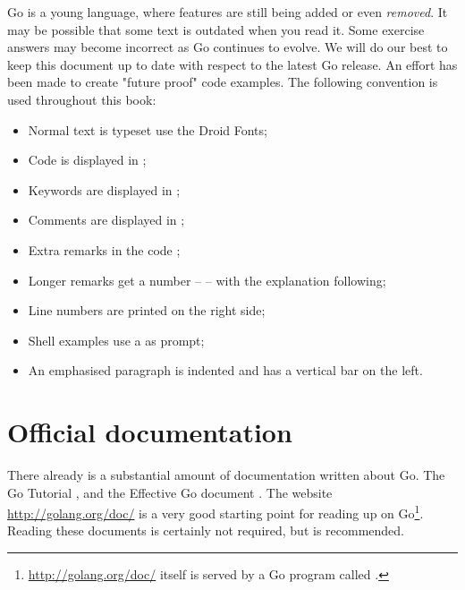 Go is a young language, where 
features are still being added or even \emph{removed}. It 
may be possible that some text is outdated when you
read it. 
Some exercise answers may become incorrect as Go continues
to evolve.
We will do our best to keep this document up to 
date with respect to the latest Go release.
An effort has been made to create "future proof" code examples.
\noindent{}The following convention is used throughout this book:
\begin{itemize}
\item Normal text is typeset use the Droid Fonts;
\item Code is displayed in ;
\item Keywords are displayed in ;
\item Comments are displayed in ;
\item Extra remarks in the code ;
\item Longer remarks get a number --  -- with the explanation following;
\item Line numbers are printed on the right side;
\item Shell examples use a \pr{} as prompt;
\item An emphasised paragraph is indented and has a vertical bar on the
left.
\end{itemize}

\section{Official documentation}
There already is a substantial amount of documentation written about Go.
The Go Tutorial \cite{go_tutorial}, and the Effective Go
document \cite{effective_go}. The
website \url{http://golang.org/doc/} is a very good starting point
for reading up on Go\footnote{\url{http://golang.org/doc/} itself is served by 
a Go program called .}. Reading these documents is
certainly not required, but is recommended.


